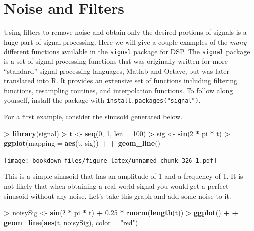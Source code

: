 \documentclass[
]{krantz}
\makeatletter
\newenvironment{Shaded}{\begin{snugshade}}{\end{snugshade}}
\newcommand{\DataTypeTok}[1]{\textcolor[rgb]{0.27,0.27,0.27}{#1}}
\newcommand{\DecValTok}[1]{\textcolor[rgb]{0.06,0.06,0.06}{#1}}
\newcommand{\FloatTok}[1]{\textcolor[rgb]{0.06,0.06,0.06}{#1}}
\newcommand{\KeywordTok}[1]{\textcolor[rgb]{0.27,0.27,0.27}{\textbf{#1}}}
\newcommand{\NormalTok}[1]{#1}
\newcommand{\OperatorTok}[1]{\textcolor[rgb]{0.43,0.43,0.43}{\textbf{#1}}}
\newcommand{\StringTok}[1]{\textcolor[rgb]{0.5,0.5,0.5}{#1}}
\newenvironment{kframe}{%
\medskip{}
\setlength{\fboxsep}{.8em}
 \def\at@end@of@kframe{}%
 \ifinner\ifhmode%
  \def\at@end@of@kframe{\end{minipage}}%
  \begin{minipage}{\columnwidth}%
 \fi\fi%
 \def\FrameCommand##1{\hskip\@totalleftmargin \hskip-\fboxsep
 \colorbox{shadecolor}{##1}\hskip-\fboxsep
     \hskip-\linewidth \hskip-\@totalleftmargin \hskip\columnwidth}%
 \MakeFramed {\advance\hsize-\width
   \@totalleftmargin\z@ \linewidth\hsize
   \@setminipage}}%
 {\par\unskip\endMakeFramed%
 \at@end@of@kframe}
\renewenvironment{Shaded}{\begin{kframe}}{\end{kframe}}
\makeatother
\begin{document}
\hypertarget{noise-and-filters}{%
\section{Noise and Filters}\label{noise-and-filters}}

Using filters to remove noise and obtain only the desired portions of signals is a huge part of signal processing. Here we will give a couple examples of the \emph{many} different functions available in the \texttt{signal} package for DSP. The \texttt{signal} package is a set of signal processing functions that was originally written for more ``standard'' signal processing languages, Matlab and Octave, but was later translated into R. It provides an extensive set of functions including filtering functions, resampling routines, and interpolation functions. To follow along yourself, install the package with \texttt{install.packages("signal")}.

For a first example, consider the sinusoid generated below.

\begin{Shaded}
\begin{Highlighting}[]
\OperatorTok{\textgreater{}}\StringTok{ }\KeywordTok{library}\NormalTok{(signal)}
\OperatorTok{\textgreater{}}\StringTok{ }\NormalTok{t \textless{}{-}}\StringTok{ }\KeywordTok{seq}\NormalTok{(}\DecValTok{0}\NormalTok{, }\DecValTok{1}\NormalTok{, }\DataTypeTok{len =} \DecValTok{100}\NormalTok{)}
\OperatorTok{\textgreater{}}\StringTok{ }\NormalTok{sig \textless{}{-}}\StringTok{ }\KeywordTok{sin}\NormalTok{(}\DecValTok{2} \OperatorTok{*}\StringTok{ }\NormalTok{pi }\OperatorTok{*}\StringTok{ }\NormalTok{t)}
\OperatorTok{\textgreater{}}\StringTok{ }\KeywordTok{ggplot}\NormalTok{(}\DataTypeTok{mapping =} \KeywordTok{aes}\NormalTok{(t, sig)) }\OperatorTok{+}\StringTok{ }
\OperatorTok{+}\StringTok{   }\KeywordTok{geom\_line}\NormalTok{()}
\end{Highlighting}
\end{Shaded}

\texttt{[image: bookdown\_files/figure-latex/unnamed-chunk-326-1.pdf]}

This is a simple sinusoid that has an amplitude of 1 and a frequency of 1. It is not likely that when obtaining a real-world signal you would get a perfect sinusoid without any noise. Let's take this graph and add some noise to it.

\begin{Shaded}
\begin{Highlighting}[]
\OperatorTok{\textgreater{}}\StringTok{ }\NormalTok{noisySig \textless{}{-}}\StringTok{ }\KeywordTok{sin}\NormalTok{(}\DecValTok{2} \OperatorTok{*}\StringTok{ }\NormalTok{pi }\OperatorTok{*}\StringTok{ }\NormalTok{t) }\OperatorTok{+}\StringTok{ }\FloatTok{0.25} \OperatorTok{*}\StringTok{ }\KeywordTok{rnorm}\NormalTok{(}\KeywordTok{length}\NormalTok{(t))}
\OperatorTok{\textgreater{}}\StringTok{ }\KeywordTok{ggplot}\NormalTok{() }\OperatorTok{+}\StringTok{ }
\OperatorTok{+}\StringTok{   }\KeywordTok{geom\_line}\NormalTok{(}\KeywordTok{aes}\NormalTok{(t, noisySig), }\DataTypeTok{color =} \StringTok{"red"}\NormalTok{)}
\end{Highlighting}
\end{Shaded}
\end{document}
